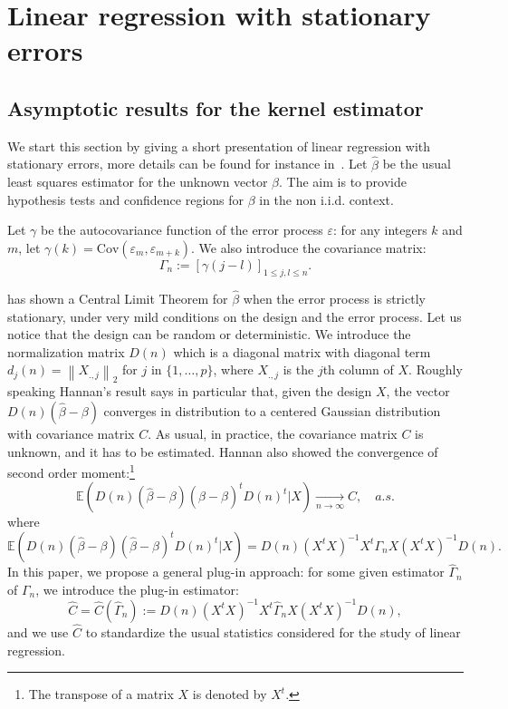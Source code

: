 \section{Linear regression with stationary errors}
\label{sec:Section2}

\subsection{Asymptotic results for the kernel estimator}
\label{sub:sec2_1}
We start this section by giving a short presentation of linear regression with stationary errors, more details can be found for instance in~\cite{caron2019}.   Let $\hat{\beta}$ be the usual least squares estimator for the unknown vector $\beta$. The aim is to provide hypothesis tests  and confidence regions for $\beta$ in the non i.i.d. context.

Let $\gamma$ be the autocovariance function of the error process $\varepsilon$: for any integers $k$ and $m$, let $\gamma(k) = \mathrm{Cov}(\varepsilon_{m}, \varepsilon_{m+k})$.
We also introduce the covariance matrix:
\begin{equation*}
\Gamma_{n} := \left[ \gamma(j-l) \right]_{1 \leq j,l \leq n}.
\label{gamma_th}
\end{equation*}

\cite{hannan1973central} has shown a Central Limit Theorem for $\hat{\beta}$ when the error process is strictly stationary, under very mild conditions on the design and the error process. Let us notice that the design can be random or deterministic. We introduce the normalization matrix $D(n)$ which is a diagonal matrix with diagonal term $d_{j}(n) = \left \| X_{.,j} \right \|_{2}$ for $j$ in $\{1, \ldots, p\}$, where $X_{.,j}$ is the $j$th column of $X$.  Roughly speaking Hannan's result says in particular that, given the design $X$, the vector $D(n)(\hat{\beta} - \beta)$ converges in distribution to a centered Gaussian distribution with covariance matrix $C$. As usual, in practice, the covariance matrix  $C$ is unknown, and it has to be estimated. Hannan also showed the convergence of second order moment:\footnote{The transpose of a matrix $X$ is denoted by $X^{t}$.}
\begin{equation*}
\mathbb{E} \left( D(n) (\hat{\beta} - \beta) (\hat{\beta} - \beta)^{t} D(n)^{t} \Big| X \right) \xrightarrow[n \rightarrow \infty]{} C, \quad a.s.
\label{second_order_moment}
\end{equation*}
where
$$ \mathbb{E} \left( D(n) (\hat{\beta} - \beta) (\hat{\beta} - \beta)^{t} D(n)^{t} \Big| X \right) = D(n) (X^{t} X)^{-1} X^{t} \Gamma_{n} X (X^{t} X)^{-1} D(n) .$$
In this paper, we propose a general plug-in approach: for some given estimator $\widehat{\Gamma}_{n}$ of $ \Gamma_{n}$, we introduce the plug-in estimator:
\begin{equation*}
\widehat C = \widehat C (\widehat{\Gamma}_{n}) := D(n) (X^{t}X)^{-1} X^{t} \widehat{\Gamma}_{n} X (X^{t}X)^{-1} D(n),
\label{main_estimator}
\end{equation*}
and we use $\widehat C$ to standardize the usual statistics considered for the study of linear regression.

